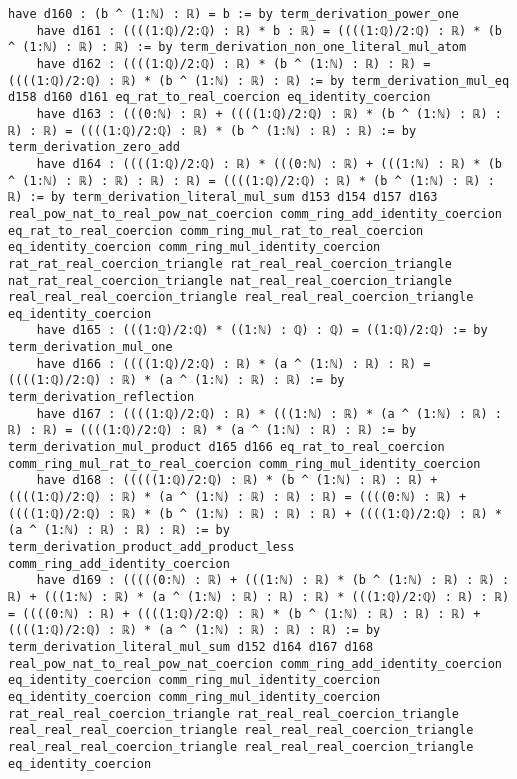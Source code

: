 \documentclass{article}
\begin{document}
\begin{tcolorbox}[colback=white!10, width=\linewidth]
\begin{lstlisting}[language=Lean4]
    have d160 : (b ^ (1:ℕ) : ℝ) = b := by term_derivation_power_one
    have d161 : ((((1:ℚ)/2:ℚ) : ℝ) * b : ℝ) = ((((1:ℚ)/2:ℚ) : ℝ) * (b ^ (1:ℕ) : ℝ) : ℝ) := by term_derivation_non_one_literal_mul_atom
    have d162 : ((((1:ℚ)/2:ℚ) : ℝ) * (b ^ (1:ℕ) : ℝ) : ℝ) = ((((1:ℚ)/2:ℚ) : ℝ) * (b ^ (1:ℕ) : ℝ) : ℝ) := by term_derivation_mul_eq d158 d160 d161 eq_rat_to_real_coercion eq_identity_coercion
    have d163 : (((0:ℕ) : ℝ) + ((((1:ℚ)/2:ℚ) : ℝ) * (b ^ (1:ℕ) : ℝ) : ℝ) : ℝ) = ((((1:ℚ)/2:ℚ) : ℝ) * (b ^ (1:ℕ) : ℝ) : ℝ) := by term_derivation_zero_add
    have d164 : ((((1:ℚ)/2:ℚ) : ℝ) * (((0:ℕ) : ℝ) + (((1:ℕ) : ℝ) * (b ^ (1:ℕ) : ℝ) : ℝ) : ℝ) : ℝ) = ((((1:ℚ)/2:ℚ) : ℝ) * (b ^ (1:ℕ) : ℝ) : ℝ) := by term_derivation_literal_mul_sum d153 d154 d157 d163 real_pow_nat_to_real_pow_nat_coercion comm_ring_add_identity_coercion eq_rat_to_real_coercion comm_ring_mul_rat_to_real_coercion eq_identity_coercion comm_ring_mul_identity_coercion rat_rat_real_coercion_triangle rat_real_real_coercion_triangle nat_rat_real_coercion_triangle nat_real_real_coercion_triangle real_real_real_coercion_triangle real_real_real_coercion_triangle eq_identity_coercion
    have d165 : (((1:ℚ)/2:ℚ) * ((1:ℕ) : ℚ) : ℚ) = ((1:ℚ)/2:ℚ) := by term_derivation_mul_one
    have d166 : ((((1:ℚ)/2:ℚ) : ℝ) * (a ^ (1:ℕ) : ℝ) : ℝ) = ((((1:ℚ)/2:ℚ) : ℝ) * (a ^ (1:ℕ) : ℝ) : ℝ) := by term_derivation_reflection
    have d167 : ((((1:ℚ)/2:ℚ) : ℝ) * (((1:ℕ) : ℝ) * (a ^ (1:ℕ) : ℝ) : ℝ) : ℝ) = ((((1:ℚ)/2:ℚ) : ℝ) * (a ^ (1:ℕ) : ℝ) : ℝ) := by term_derivation_mul_product d165 d166 eq_rat_to_real_coercion comm_ring_mul_rat_to_real_coercion comm_ring_mul_identity_coercion
    have d168 : (((((1:ℚ)/2:ℚ) : ℝ) * (b ^ (1:ℕ) : ℝ) : ℝ) + ((((1:ℚ)/2:ℚ) : ℝ) * (a ^ (1:ℕ) : ℝ) : ℝ) : ℝ) = ((((0:ℕ) : ℝ) + ((((1:ℚ)/2:ℚ) : ℝ) * (b ^ (1:ℕ) : ℝ) : ℝ) : ℝ) + ((((1:ℚ)/2:ℚ) : ℝ) * (a ^ (1:ℕ) : ℝ) : ℝ) : ℝ) := by term_derivation_product_add_product_less comm_ring_add_identity_coercion
    have d169 : (((((0:ℕ) : ℝ) + (((1:ℕ) : ℝ) * (b ^ (1:ℕ) : ℝ) : ℝ) : ℝ) + (((1:ℕ) : ℝ) * (a ^ (1:ℕ) : ℝ) : ℝ) : ℝ) * (((1:ℚ)/2:ℚ) : ℝ) : ℝ) = ((((0:ℕ) : ℝ) + ((((1:ℚ)/2:ℚ) : ℝ) * (b ^ (1:ℕ) : ℝ) : ℝ) : ℝ) + ((((1:ℚ)/2:ℚ) : ℝ) * (a ^ (1:ℕ) : ℝ) : ℝ) : ℝ) := by term_derivation_literal_mul_sum d152 d164 d167 d168 real_pow_nat_to_real_pow_nat_coercion comm_ring_add_identity_coercion eq_identity_coercion comm_ring_mul_identity_coercion eq_identity_coercion comm_ring_mul_identity_coercion rat_real_real_coercion_triangle rat_real_real_coercion_triangle real_real_real_coercion_triangle real_real_real_coercion_triangle real_real_real_coercion_triangle real_real_real_coercion_triangle eq_identity_coercion

\end{lstlisting}
\end{tcolorbox}
\end{document}
